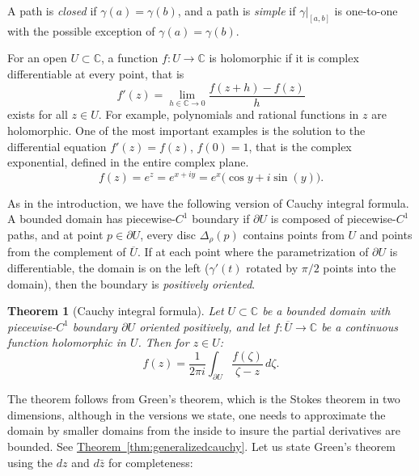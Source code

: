 \documentclass[12pt,openany]{book}
\newcommand{\C}{{\mathbb{C}}}
\newcommand{\myindex}[1]{#1\index{#1}}
\theoremstyle{plain}
\newtheorem{thm}{Theorem}[section]
\theoremstyle{remark}
\theoremstyle{definition}
\theoremstyle{exercise}
\theoremstyle{example}
\newcommand{\thmref}[1]{\hyperref[#1]{Theorem~\ref*{#1}}}
\begin{document}
A path is \emph{closed}
if $\gamma(a) = \gamma(b)$,
and a path is \emph{simple}
if $\gamma|_{[a,b]}$ is one-to-one
with the possible exception of $\gamma(a) = \gamma(b)$.

For an open $U \subset \C$,
a function $f \colon U \to \C$ is holomorphic if it is complex
differentiable at every point, that is
\begin{equation*}
f'(z) = \lim_{h \in \C \to 0} \frac{f(z+h) - f(z)}{h}
\end{equation*}
exists for all $z \in U$.  For example, polynomials and rational
functions in $z$ are holomorphic.  One of the most important examples
is the solution to the differential equation $f'(z) = f(z)$, $f(0) = 1$, that is
the complex exponential, defined in the entire complex plane.
\begin{equation*}
f(z) = e^z = e^{x+iy} = e^x \bigl( \cos y + i \sin(y) \bigr) .
\end{equation*}

As in the introduction, we have the following version of Cauchy integral
formula.  A bounded domain has piecewise-$C^1$ boundary if $\partial U$
is composed of piecewise-$C^1$ paths, and at point $p \in \partial U$,
every disc $\Delta_\rho(p)$ contains points from $U$ and points from the
complement of $\overline{U}$.  If 
at each point where the parametrization of $\partial U$ is differentiable,
the domain is on the left ($\gamma'(t)$ rotated by $\pi/2$ points into the
domain), then the boundary is \emph{\myindex{positively oriented}}.

\pagebreak[2]

\begin{thm}[Cauchy integral formula]
Let $U \subset \C$ be a bounded domain with piecewise-$C^1$ boundary
$\partial U$ oriented positively, and let
$f \colon \overline{U} \to \C$ be a continuous function
holomorphic in $U$.
Then for $z \in U$:
\begin{equation*}
f(z) =
\frac{1}{2\pi i}
\int_{\partial U}
\frac{f(\zeta)}{\zeta-z}
\,
d \zeta .
\end{equation*}
\end{thm}

The theorem follows from Green's theorem, which is the Stokes theorem
in two dimensions, although in the versions we state, one needs to
approximate the domain by smaller domains from the inside to insure
the partial derivatives are bounded.  See
\thmref{thm:generalizedcauchy}.  Let us state Green's theorem using
the $dz$ and $d\bar{z}$ for completeness:
\end{document}
